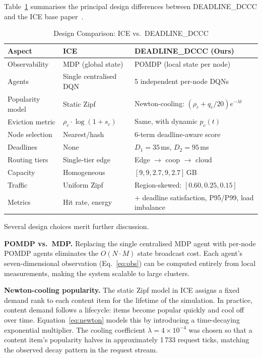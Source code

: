 \documentclass[conference]{IEEEtran}
\begin{document}
Table~\ref{tab:comparison} summarises the principal design differences
between DEADLINE\_DCCC and the ICE base paper~\cite{ice2022}.

\begin{table}[t]
  \caption{Design Comparison: ICE vs.\ DEADLINE\_DCCC}
  \label{tab:comparison}
  \renewcommand{\arraystretch}{1.25}
  \begin{tabular}{lp{1.8cm}p{2.4cm}}
    \toprule
    \textbf{Aspect} & \textbf{ICE~\cite{ice2022}} & \textbf{DEADLINE\_DCCC (Ours)} \\
    \midrule
    Observability    & MDP (global state)          & POMDP (local state per node) \\
    Agents           & Single centralised DQN      & 5 independent per-node DQNs \\
    Popularity model & Static Zipf                 & Newton-cooling: $({\rho_c + q_c/20}) e^{-\lambda t}$ \\
    Eviction metric  & $\rho_c \cdot \log(1{+}s_c)$ & Same, with dynamic $p_c(t)$ \\
    Node selection   & Nearest/hash                & 6-term deadline-aware score \\
    Deadlines        & None                        & $D_1=35$\,ms, $D_2=95$\,ms \\
    Routing tiers    & Single-tier edge            & Edge $\to$ coop $\to$ cloud \\
    Capacity         & Homogeneous                 & $[9,9,2.7,9,2.7]$\,GB \\
    Traffic          & Uniform Zipf                & Region-skewed: $[0.60,0.25,0.15]$ \\
    Metrics          & Hit rate, energy            & + deadline satisfaction, P95/P99, load imbalance \\
    \bottomrule
  \end{tabular}
\end{table}

Several design choices merit further discussion.

\textbf{POMDP vs.\ MDP.}  Replacing the single centralised MDP agent
with per-node POMDP agents eliminates the $O(N \cdot M)$ state
broadcast cost.  Each agent's seven-dimensional observation
(Eq.~\ref{eq:obs}) can be computed entirely from local measurements,
making the system scalable to large clusters.

\textbf{Newton-cooling popularity.}  The static Zipf model in ICE
assigns a fixed demand rank to each content item for the lifetime of
the simulation.  In practice, content demand follows a lifecycle:
items become popular quickly and cool off over time.
Equation~\ref{eq:newton} models this by introducing a time-decaying
exponential multiplier.  The cooling coefficient $\lambda = 4 \times
10^{-4}$ was chosen so that a content item's popularity halves in
approximately 1\,733 request ticks, matching the observed decay
pattern in the request stream.
\end{document}

